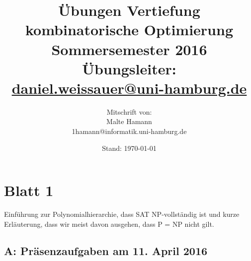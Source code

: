 \documentclass[12pt,a4paper]{scrreprt}
\author{\normalsize Mitschrift von:\\ Malte Hamann\\1hamann@informatik.uni-hamburg.de}
\title{Übungen Vertiefung kombinatorische Optimierung\\\huge Sommersemester 2016\\\vspace{2\baselineskip}\Large Übungsleiter: \url{daniel.weissauer@uni-hamburg.de}}
\date{Stand: \today}
\begin{document}
\maketitle
\tableofcontents


\chapter{Blatt 1}

Einführung zur Polynomialhierarchie, dass SAT NP-vollständig ist und kurze Erläuterung, dass wir meist davon ausgehen, dass P = NP nicht gilt.

\section*{A: Präsenzaufgaben am 11. April 2016}
\end{document}
